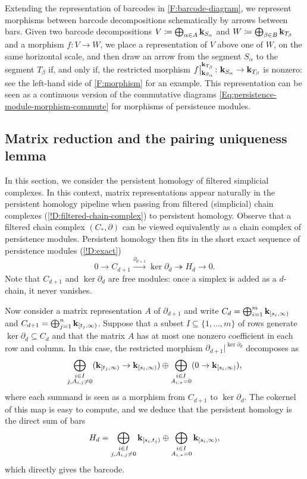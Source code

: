 \begin{notation}
  Extending the representation of barcodes in \cref{F:barcode-diagram}, we represent morphisms between barcode decompositions schematically by arrows between bars. Given two barcode decompositions $V \coloneq \bigoplus_{\alpha \in A} \mathbf{k}_{S_\alpha}$ and $W \coloneq \bigoplus_{\beta \in B} \mathbf{k}_{T_\beta}$ and a morphism $f \colon V \to W$, we place a representation of $V$ above one of $W$, on the same horizontal scale, and then draw an arrow from the segment $S_\alpha$ to the segment $T_\beta$ if, and only if, the restricted morphism $f\big|_{\mathbf{k}_{S_\alpha}}^{\mathbf{k}_{T_\beta}} \colon \mathbf{k}_{S_\alpha} \to \mathbf{k}_{T_\beta}$ is nonzero: see the left-hand side of \cref{F:morphism} for an example. This representation can be seen as a continuous version of the commutative diagrams \eqref{Eq:persistence-module-morphism-commute} for morphisms of persistence modules.
\end{notation}

\subsection{Matrix reduction and the pairing uniqueness lemma}
\label{SS:reduction}

In this section, we consider the persistent homology of filtered simplicial complexes. In this context, matrix representations appear naturally in the persistent homology pipeline when passing from filtered (simplicial) chain complexes (\cref{!D:filtered-chain-complex}) to persistent homology. Observe that a filtered chain complex $(C_*, \partial)$ can be viewed equivalently as a chain complex of persistence modules. Persistent homology then fits in the short exact sequence of persistence modules (\cref{!D:exact})
\[
  0 \to C_{d + 1} \xrightarrow{\partial_{d + 1}} \ker \partial_d \twoheadrightarrow H_d \to 0. 
\]
Note that $C_{d + 1}$ and $\ker \partial_d$ are free modules: once a simplex is added as a $d$-chain, it never vanishes.

Now consider a matrix representation $A$ of $\partial_{d + 1}$ and write $C_d = \bigoplus_{i = 1}^m \mathbf{k}_{[s_i, \infty)}$ and $C_{d + 1} = \bigoplus_{j = 1}^n \mathbf{k}_{[t_j, \infty)}$. Suppose that a subset $I \subseteq \{1, \ldots, m\}$ of rows generate $\ker \partial_d \subseteq C_d$ and that the matrix $A$ has at most one nonzero coefficient in each row and column. In this case, the restricted morphism $\partial_{d + 1}\big|^{\ker \partial_d}$ decomposes as
\[
  \bigoplus_{\substack{i \in I \\ j, A_{i, j} \neq 0}} (\mathbf{k}_{[t_j, \infty)} \to \mathbf{k}_{[s_i, \infty)}) \oplus \bigoplus_{\substack{i \in I \\ A_{i, *} = 0}} (0 \to \mathbf{k}_{[s_i, \infty)}),
\]
where each summand is seen as a morphism from $C_{d + 1}$ to $\ker \partial_d$. The cokernel of this map is easy to compute, and we deduce that the persistent homology is the direct sum of bars
\[
  H_d = \bigoplus_{\substack{i \in I \\ j, A_{i, j} \neq 0}} \mathbf{k}_{[s_i, t_j)} \oplus \bigoplus_{\substack{i \in I \\ A_{i, *} = 0}} \mathbf{k}_{[s_i, \infty)},
\]
which directly gives the barcode.

